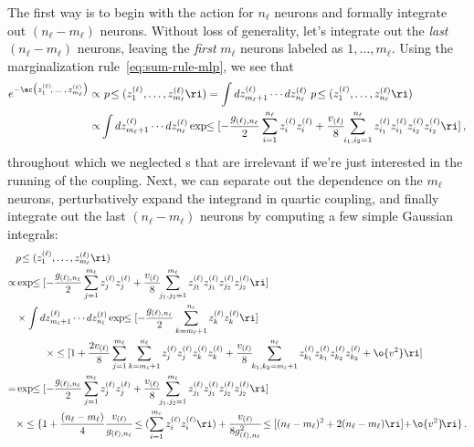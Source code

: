 The first way is to begin with the action for $n_{\ell}$ neurons and formally integrate out $(n_{\ell}-m_{\ell})$ neurons. Without loss of generality, let's integrate out the \emph{last} $(n_{\ell}-m_{\ell})$ neurons, leaving the \emph{first} $m_\ell$ neurons labeled as $1, \ldots, m_\ell$. 
Using the marginalization rule~\eqref{eq:sum-rule-mlp}, we see that
\begin{align}
e^{-\ac\big(z_1^{(\ell)}\!,\,\ldots\,, \, z_{m_{\ell}}^{(\ell)}\big)}\propto&\ p\!\le(z_1^{(\ell)},\ldots, z_{m_{\ell}}^{(\ell)}\ri)=\int d{ z_{m_{\ell}+1}^{(\ell)}}\cdots d{ z_{n_{\ell}}^{(\ell)}}\ p\!\le(z_1^{(\ell)},\ldots, z_{n_{\ell}}^{(\ell)}\ri)\\
\propto&\int d{ z_{m_{\ell}+1}^{(\ell)}}\cdots d{ z_{n_{\ell}}^{(\ell)}}\exp\!\!\le[-\frac{g_{(\ell),n_{\ell}}}{2}\sum_{i=1}^{n_{\ell}}z_{i}^{(\ell)}z_{i}^{(\ell)}+\frac{v_{(\ell)}}{8}\!\!\sum_{i_1,i_2=1}^{n_{\ell}}z_{i_1}^{(\ell)}z_{i_1}^{(\ell)}z_{i_2}^{(\ell)}z_{i_2}^{(\ell)}\ri]\, ,\notag
\end{align}
throughout which we neglected s that are irrelevant if we're just interested in the running of the coupling.
Next, we can separate out the dependence on the $m_{\ell}$ neurons, perturbatively expand the integrand in quartic coupling, and finally integrate out the last $(n_{\ell}-m_{\ell})$ neurons by computing a few simple Gaussian integrals:
\begin{align}
&p\!\le(z_1^{(\ell)},\ldots, z_{m_{\ell}}^{(\ell)}\ri)\, \\
\propto&\exp\!\!\le[-\frac{g_{(\ell),n_{\ell}}}{2}\sum_{j=1}^{m_{\ell}}z_{j}^{(\ell)}z_{j}^{(\ell)}+\frac{v_{(\ell)}}{8}\!\!\sum_{j_1,j_2=1}^{m_{\ell}}z_{j_1}^{(\ell)}z_{j_1}^{(\ell)}z_{j_2}^{(\ell)}z_{j_2}^{(\ell)}\ri]\, \notag\\
&\times\int d{ z_{m_{\ell}+1}^{(\ell)}}\cdots d{z_{n_{\ell}}^{(\ell)}}\exp\!\!\le[-\frac{g_{(\ell),n_{\ell}}}{2}\sum_{k=m_{\ell}+1}^{n_{\ell}}z_{k}^{(\ell)}z_{k}^{(\ell)}\ri]\, \notag\\
&\quad \quad \quad \times\le[1+\frac{2v_{(\ell)}}{8}\sum_{j=1}^{m_{\ell}}\sum_{k=m_{\ell}+1}^{n_{\ell}}z_{j}^{(\ell)}z_{j}^{(\ell)}z_{k}^{(\ell)}z_{k}^{(\ell)}+\frac{v_{(\ell)}}{8}\!\!\sum_{k_1,k_2=m_{\ell}+1}^{n_{\ell}}z_{k_1}^{(\ell)}z_{k_1}^{(\ell)}z_{k_2}^{(\ell)}z_{k_2}^{(\ell)}+\o{v^2}\ri]\, \notag\\
=&\exp\!\!\le[-\frac{g_{(\ell),n_{\ell}}}{2}\sum_{j=1}^{m_{\ell}}z_{j}^{(\ell)}z_{j}^{(\ell)}+\frac{v_{(\ell)}}{8}\!\!\sum_{j_1,j_2=1}^{m_{\ell}}z_{j_1}^{(\ell)}z_{j_1}^{(\ell)}z_{j_2}^{(\ell)}z_{j_2}^{(\ell)}\ri]\, \notag\\
&\times\le\{1+\frac{(n_{\ell}-m_{\ell})}{4} \frac{v_{(\ell)}}{g_{(\ell),n_{\ell}}}\!\le(\sum_{i=1}^{m_{\ell}}z_{i}^{(\ell)}z_{i}^{(\ell)}\ri)+\frac{v_{(\ell)}}{8g_{(\ell),n_{\ell}}^2}\!\le[(n_{\ell}-m_{\ell})^2+2(n_{\ell}-m_{\ell})\ri]\!+\!\o{v^2}\!\ri\}\, .\notag%
\end{align}
